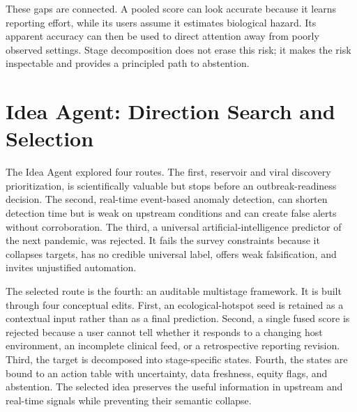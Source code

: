 \documentclass[conference]{IEEEtran}
\begin{document}
These gaps are connected. A pooled score can look accurate because it learns reporting effort, while its users assume it estimates biological hazard. Its apparent accuracy can then be used to direct attention away from poorly observed settings. Stage decomposition does not erase this risk; it makes the risk inspectable and provides a principled path to abstention.

\section{Idea Agent: Direction Search and Selection}

The Idea Agent explored four routes. The first, reservoir and viral discovery prioritization, is scientifically valuable but stops before an outbreak-readiness decision. The second, real-time event-based anomaly detection, can shorten detection time but is weak on upstream conditions and can create false alerts without corroboration. The third, a universal artificial-intelligence predictor of the next pandemic, was rejected. It fails the survey constraints because it collapses targets, has no credible universal label, offers weak falsification, and invites unjustified automation.

The selected route is the fourth: an auditable multistage framework. It is built through four conceptual edits. First, an ecological-hotspot seed is retained as a contextual input rather than as a final prediction. Second, a single fused score is rejected because a user cannot tell whether it responds to a changing host environment, an incomplete clinical feed, or a retrospective reporting revision. Third, the target is decomposed into stage-specific states. Fourth, the states are bound to an action table with uncertainty, data freshness, equity flags, and abstention. The selected idea preserves the useful information in upstream and real-time signals while preventing their semantic collapse.
\end{document}
